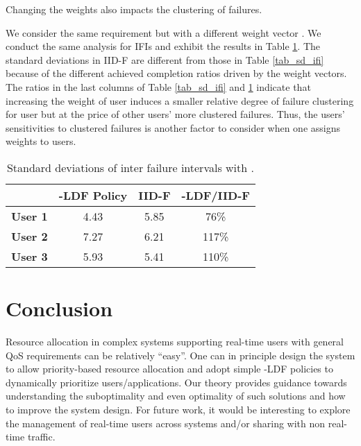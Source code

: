 \documentclass[prodmode,acmtompecs]{acmsmall}
\newcommand{\myComments}[1]{}
\newif\ifhuawei
\newcommand{\huaweiStart}{\ifhuawei  \myComments{Huawei version: }}
\newcommand{\commentEnd}{\myComments{End}}
\begin{document}
Changing the weights also impacts the clustering of failures. 

We consider the same requirement  but with a different weight vector . We conduct the same analysis for IFIs and exhibit the results in Table \ref{tab_sd_ifi_different_weights}. 
The standard deviations in IID-F are different from those in Table \ref{tab_sd_ifi} because of the different achieved completion ratios driven by the weight vectors. 
The ratios in the last columns of Table \ref{tab_sd_ifi} and \ref{tab_sd_ifi_different_weights} indicate that increasing the weight of user  induces a smaller relative degree of failure clustering for user  but at the price of other users' more clustered failures. Thus, the users' sensitivities to clustered failures is another factor to consider when one assigns weights to users. 

\begin{table}[h]
\normalsize
    \centering
    \begin{tabular}{| c | c | c | c |}
    \hline
    ~ & {\bf -LDF Policy} & {\bf IID-F} & {\bf -LDF/IID-F}\\
    \hline
    {\bf User 1} & 4.43 & 5.85 & 76\%	\\
    \hline
    {\bf User 2} & 7.27 & 6.21 & 117\%	\\
    \hline
    {\bf User 3} & 5.93 & 5.41 & 110\%	\\
    \hline
    \end{tabular}
    \caption{Standard deviations of inter failure intervals with . }
    \label{tab_sd_ifi_different_weights}
\end{table}
\commentEnd\fi


\section{Conclusion}
Resource allocation in complex systems supporting real-time users with general QoS requirements can be relatively ``easy''. One can in principle design the system to allow priority-based resource allocation and adopt simple -LDF policies to dynamically prioritize users/applications. 
Our theory provides guidance towards understanding the suboptimality and even optimality of such solutions and how to improve the system design. 
For future work, it would be interesting to explore the management of real-time users across systems and/or sharing with non real-time traffic. 





\huaweiStart
\end{document}
